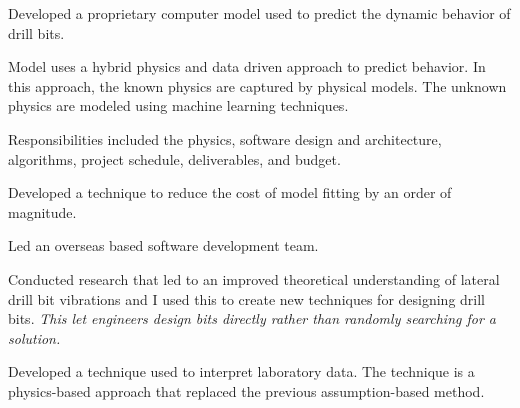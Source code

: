 \documentclass{leresume}
\begin{document}
		\begin{bulletedlist}
			
		\item
		
				Developed a proprietary computer model used to predict the dynamic behavior of drill bits.
				
		\begin{bulletedlist}
			
		\item
		
						Model uses a hybrid physics and data driven approach to predict behavior.  In this approach, the known physics are captured by physical models.  The unknown physics are modeled using machine learning techniques.
					
		\item
		
						Responsibilities included the physics, software design and architecture, algorithms, project schedule, deliverables, and budget.
					
		\item
		
						Developed a technique to reduce the cost of model fitting by an order of magnitude.
					
		\item
		Led an overseas based software development team.
		\end{bulletedlist}
	
		\item
		
				Conducted research that led to an improved theoretical understanding of lateral drill bit vibrations and I used this to create new techniques for
				designing drill bits. 
		\textit{This let engineers design bits directly rather than randomly searching for a solution.}
	
		\item
		Developed a technique used to interpret laboratory data.  The technique is a physics-based approach that replaced the previous assumption-based method.
		\end{bulletedlist}
	
		
		
\end{document}

